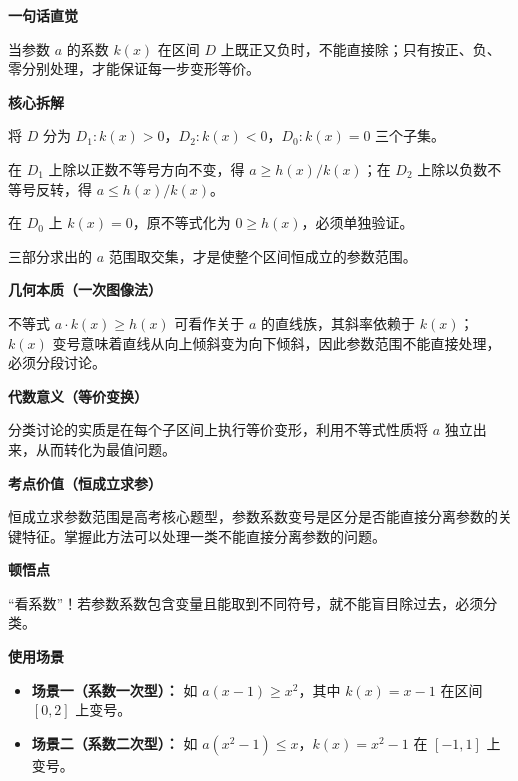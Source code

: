 \begin{explanationbox}

	\textbf{\textcolor{CExplanation}{一句话直觉}}

	当参数 $a$ 的系数 $k(x)$ 在区间 $D$ 上既正又负时，不能直接除；只有按正、负、零分别处理，才能保证每一步变形等价。

	\medskip
	\textbf{\textcolor{CExplanation}{核心拆解}}
	\begin{description}[style=nextline, leftmargin=2.8em, labelsep=0.5em, itemsep=0.45em]
		\item[\textbf{要点一（符号分段）：}] 将 $D$ 分为 $D_1: k(x)>0$，$D_2: k(x)<0$，$D_0: k(x)=0$ 三个子集。
		\item[\textbf{要点二（方向法则）：}] 在 $D_1$ 上除以正数不等号方向不变，得 $a\ge h(x)/k(x)$；在 $D_2$ 上除以负数不等号反转，得 $a\le h(x)/k(x)$。
		\item[\textbf{要点三（零值检查）：}] 在 $D_0$ 上 $k(x)=0$，原不等式化为 $0\ge h(x)$，必须单独验证。
		\item[\textbf{要点四（交集合成）：}] 三部分求出的 $a$ 范围取交集，才是使整个区间恒成立的参数范围。
	\end{description}

	\medskip
	\textbf{\textcolor{CExplanation}{几何本质（一次图像法）}}

	不等式 $a\cdot k(x)\ge h(x)$ 可看作关于 $a$ 的直线族，其斜率依赖于 $k(x)$；$k(x)$ 变号意味着直线从向上倾斜变为向下倾斜，因此参数范围不能直接处理，必须分段讨论。

	\medskip
	\textbf{\textcolor{CExplanation}{代数意义（等价变换）}}

	分类讨论的实质是在每个子区间上执行等价变形，利用不等式性质将 $a$ 独立出来，从而转化为最值问题。

	\medskip
	\textbf{\textcolor{CExplanation}{考点价值（恒成立求参）}}

	恒成立求参数范围是高考核心题型，参数系数变号是区分是否能直接分离参数的关键特征。掌握此方法可以处理一类不能直接分离参数的问题。

	\medskip
	\textbf{\textcolor{CExplanation}{顿悟点}}

	“看系数”！若参数系数包含变量且能取到不同符号，就不能盲目除过去，必须分类。

	\medskip
	\textbf{\textcolor{CExplanation}{使用场景}}
	\begin{itemize}[leftmargin=*, itemsep=0.5em, topsep=0.4em]
		\item \textbf{场景一（系数一次型）：} 如 $a(x-1)\ge x^2$，其中 $k(x)=x-1$ 在区间 $[0,2]$ 上变号。
		\item \textbf{场景二（系数二次型）：} 如 $a(x^2-1)\le x$，$k(x)=x^2-1$ 在 $[-1,1]$ 上变号。
	\end{itemize}
\end{explanationbox}
